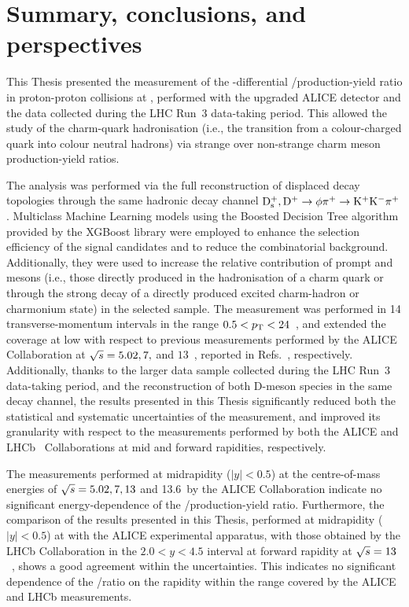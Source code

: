 \chapter{Summary, conclusions, and perspectives}\label{ch:conclusions}

This Thesis presented the measurement of the \pt-differential \ds/\dpl production-yield ratio in proton-proton collisions at \thirteen, performed with the upgraded ALICE detector and the data collected during the LHC Run~3 data-taking period. This allowed the study of the charm-quark hadronisation (i.e., the transition from a colour-charged quark into colour neutral hadrons) via strange over non-strange charm meson production-yield ratios.

The analysis was performed via the full reconstruction of displaced decay topologies through the same hadronic decay channel $\mathrm{D_s^+}, \mathrm{D^+} \rightarrow \phi\pi^+\rightarrow\mathrm{K^+K^-\pi^+}$. Multiclass Machine Learning models using the Boosted Decision Tree algorithm provided by the XGBoost library were employed to enhance the selection efficiency of the signal candidates and to reduce the combinatorial background. Additionally, they were used to increase the relative contribution of prompt \ds and \dpl mesons (i.e., those directly produced in the hadronisation of a charm quark or through the strong decay of a directly produced excited charm-hadron or charmonium state) in the selected sample. The measurement was performed in 14 transverse-momentum intervals in the range $0.5<p_\mathrm{T}<24$~\gevc, and extended the \pt coverage at low \pt with respect to previous measurements performed by the ALICE Collaboration at $\sqrt{s} = 5.02, 7,$ and $13$~\tev, reported in Refs.~\cite{ALICE:2021mgk,ALICE:2017olh,ALICE:2023sgl}, respectively. Additionally, thanks to the larger data sample collected during the LHC Run~3 data-taking period, and the reconstruction of both D-meson species in the same decay channel, the results presented in this Thesis significantly reduced both the statistical and systematic uncertainties of the measurement, and improved its granularity with respect to the measurements performed by both the ALICE and LHCb~\cite{LHCb:2015swx} Collaborations at mid and forward rapidities, respectively.

The measurements performed at midrapidity ($\lvert y\rvert<0.5$) at the centre-of-mass energies of  $\sqrt{s} = 5.02, 7, 13$ and 13.6~\tev by the ALICE Collaboration indicate no significant energy-dependence of the \ds/\dpl production-yield ratio. Furthermore, the comparison of the results presented in this Thesis, performed at midrapidity ($\lvert y\rvert<0.5$) at \thirteen with the ALICE experimental apparatus, with those obtained by the LHCb Collaboration in the $2.0<y<4.5$ interval at forward rapidity at $\sqrt{s}=13$~\tev, shows a good agreement within the uncertainties. This indicates no significant dependence of the \ds/\dpl ratio on the rapidity within the range covered by the ALICE and LHCb measurements. 

